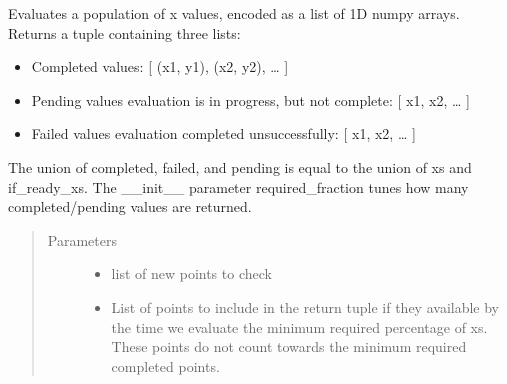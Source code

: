 \documentclass[letterpaper,12pt,english]{sphinxmanual}
\begin{document}
\begin{fulllineitems}
\begin{fulllineitems}
\label{\detokenize{PARyOpt.evaluators:PARyOpt.evaluators.paryopt_async.AsyncFunctionEvaluator.evaluate_population}}
\sphinxAtStartPar
Evaluates a population of x values, encoded as a list of 1D numpy arrays.
Returns a tuple containing three lists:
\begin{itemize}
\item {} 
\sphinxAtStartPar
Completed values: {[} (x1, y1), (x2, y2), … {]}

\item {} 
\sphinxAtStartPar
Pending values \sphinxhyphen{} evaluation is in progress, but not complete: {[} x1, x2, … {]}

\item {} 
\sphinxAtStartPar
Failed  values \sphinxhyphen{} evaluation completed unsuccessfully: {[} x1, x2, … {]}

\end{itemize}

\sphinxAtStartPar
The union of completed, failed, and pending is equal to the union of xs and if\_ready\_xs.
The \_\_init\_\_ parameter required\_fraction tunes how many completed/pending values are returned.
\begin{quote}\begin{description}
\item[{Parameters}] \leavevmode\begin{itemize}
\item {} 
\sphinxAtStartPar
{} \textendash{} list of new points to check

\item {} 
\sphinxAtStartPar
{} \textendash{} List of points to include in the return tuple if they available by the time we
evaluate the minimum required percentage of xs. These points do not count towards
the minimum required completed points.


\end{itemize}
\end{description}
\end{quote}
\end{fulllineitems}
\end{fulllineitems}
\end{document}
